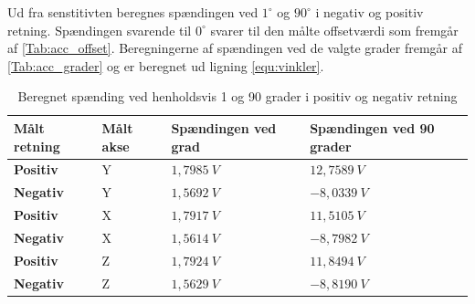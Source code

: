 Ud fra senstitivten beregnes spændingen ved $1^{\circ}$ og $90^{\circ}$ i negativ og positiv retning. Spændingen svarende til $0^{\circ}$ svarer til den målte offsetværdi som fremgår af \autoref{Tab:acc_offset}. Beregningerne af spændingen ved de valgte grader fremgår af \autoref{Tab:acc_grader} og er beregnet ud ligning \autoref{equ:vinkler}.

 \begin{table}[H]
	\centering
	\begin{tabular}{|l|l|l|l|}
	\textbf{Målt retning} & \textbf{Målt akse} & \textbf{Spændingen ved grad} & \textbf{Spændingen ved 90 grader} \\ \hline
    \textbf{Positiv} 	& Y		& $1,7985~V$   	&	$12,7589~V$\\ \hline
    \textbf{Negativ}		& Y		& $1,5692~V$  	&	$-8,0339~V$\\ \hline
    \textbf{Positiv} 	& X 		& $1,7917~V$   	& 	$11,5105~V$ \\ \hline     
    \textbf{Negativ}		& X 		& $1,5614~V$		&	$-8,7982~V$\\ \hline
    \textbf{Positiv} 	& Z 		& $1,7924~V$   	& 	$11,8494~V$	\\ \hline		
    \textbf{Negativ} 	& Z 		& $1,5629~V$		&	$-8,8190~V$ \\ \hline
	\end{tabular}
	\caption{Beregnet spænding ved henholdsvis 1 og 90 grader i positiv og negativ retning}
	\label{Tab:acc_grader}
\end{table}





